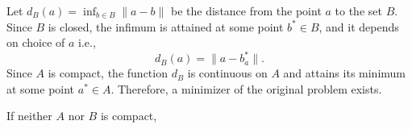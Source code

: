 \begin{answer}
    \rpos
    \begin{answerenum}
        \item Let \(d_B(a) = \inf_{b \in B} \|a-b\|\) be the distance from the point \(a\) to the set \(B\).
            Since \(B\) is closed, the infimum is attained at some point \(b^\ast \in B\), and it depends on choice of \(a\) i.e.,
            \[
                d_B(a) = \|a-b_a^\ast\|.
            \]
            Since \(A\) is compact, the function \(d_B\) is continuous on \(A\) and attains its minimum at some point \(a^\ast \in A\).
            Therefore, a minimizer of the original problem exists.
        \item If neither \(A\) nor \(B\) is compact, 
            
    \end{answerenum}
\end{answer}